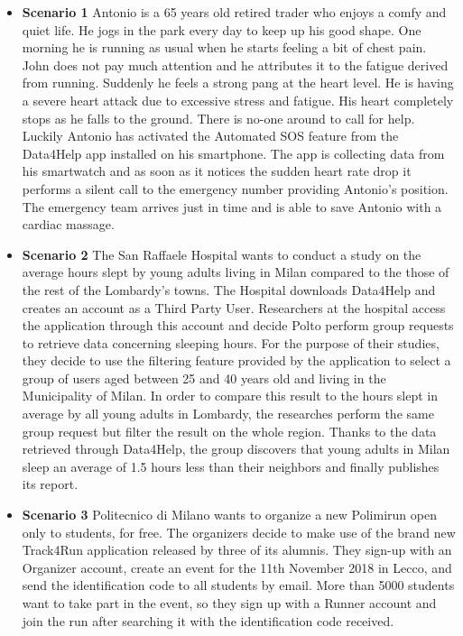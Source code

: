 \documentclass[titlepage]{article}
\begin{document}
				\begin{itemize}
					\item {\bf Scenario 1} \linebreak
					Antonio is a 65 years old retired trader who enjoys a comfy and quiet life. 
					He jogs in the park every day to keep up his good shape. One morning he is running as usual when 					he starts feeling a bit of chest pain. John does not pay much attention and he attributes it to the 					fatigue derived from running. Suddenly he feels a strong pang at the heart level. He is having a 					severe heart attack due to excessive stress and fatigue. His heart completely stops as he falls to 					the ground. There is no-one around to call for help. Luckily Antonio has activated the Automated 					SOS feature from the Data4Help app installed on his smartphone. The app is collecting data from 					his smartwatch and as soon as it notices the sudden heart rate drop it performs a silent call to the 					emergency number providing Antonio’s position. The emergency team arrives just in time and is 					able to save Antonio with a cardiac massage.
					\item {\bf Scenario 2} \linebreak
					The San Raffaele Hospital wants to conduct a study on the average hours slept by young adults 					living in Milan compared to the those of the rest of the Lombardy’s towns. The Hospital downloads 					Data4Help and creates an account as a Third Party User. Researchers at the hospital access the 					application through this account  and decide Polto perform group requests to retrieve data 						concerning sleeping hours. 
					For the purpose of their studies, they decide to use the filtering feature provided by the application 					to select a group of users aged between 25 and 40 years old and living in the Municipality of Milan. 					In order to compare this result to the hours slept in average by all young adults in Lombardy, the 					researches perform the same group request but filter the result on the whole region. 
					Thanks to the data retrieved through Data4Help, the group discovers that young adults in Milan 					sleep an average of 1.5 hours less than their neighbors and finally publishes its report.
					\item {\bf Scenario 3} \linebreak
					Politecnico di Milano wants to organize a new Polimirun open only to students, for free. The 						organizers decide to make use of the brand new Track4Run application released by three of its 					alumnis. They sign-up with an Organizer account, create an event for the 11th November 2018 in 					Lecco, and send the identification code to all students by email. More than 5000 students want to 					take part in the event, so they sign up with a Runner account and join the run after searching it with 					the identification code received.

\end{itemize}
\end{document}
